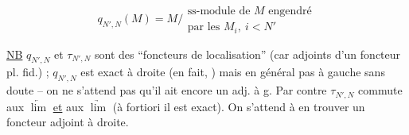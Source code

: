 
\[
 q_{N',N}(M)=M/\substack{\text{ss-module de }M\text{ engendré}\\\text{par les }M_i,\ i<N'}
\]

\uline{NB} $q_{N',N}$ et $\tau_{N',N}$ sont des ``foncteurs de localisation'' (car adjoints d'un foncteur pl. fid.) ;  $q_{N',N}$ est exact à droite (en fait, ) mais en général pas à gauche sans doute -- on ne s'attend pas qu'il ait encore un adj. à g. Par contre $\tau_{N',N}$ commute aux $\underleftarrow{\lim}$ \uline{et} aux $\underrightarrow{\lim}$ (à fortiori il est exact). On s'attend à en trouver un foncteur adjoint à droite.


